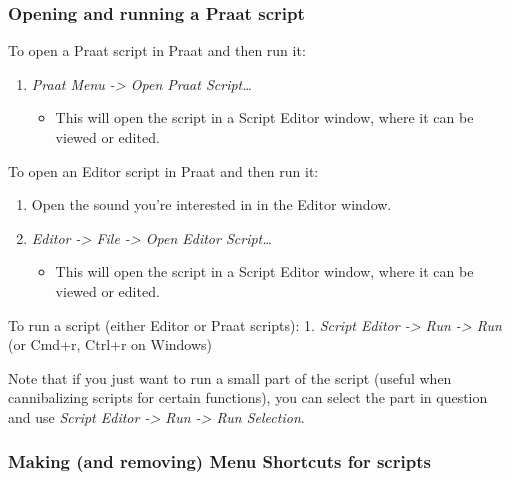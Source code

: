 \hypertarget{opening-and-running-a-praat-script}{%
\subsubsection{Opening and running a Praat
script}\label{opening-and-running-a-praat-script}}

To open a Praat script in Praat and then run it:

\begin{enumerate}
\def\labelenumi{\arabic{enumi}.}
\tightlist
\item
  \emph{Praat Menu -\textgreater{} Open Praat Script\ldots{}}

  \begin{itemize}
  \tightlist
  \item
    This will open the script in a Script Editor window, where it can be
    viewed or edited.
  \end{itemize}
\end{enumerate}

To open an Editor script in Praat and then run it:

\begin{enumerate}
\def\labelenumi{\arabic{enumi}.}
\tightlist
\item
  Open the sound you're interested in in the Editor window.
\item
  \emph{Editor -\textgreater{} File -\textgreater{} Open Editor
  Script\ldots{}}

  \begin{itemize}
  \tightlist
  \item
    This will open the script in a Script Editor window, where it can be
    viewed or edited.
  \end{itemize}
\end{enumerate}

To run a script (either Editor or Praat scripts): 1. \emph{Script Editor
-\textgreater{} Run -\textgreater{} Run} (or Cmd+r, Ctrl+r on Windows)

Note that if you just want to run a small part of the script (useful
when cannibalizing scripts for certain functions), you can select the
part in question and use \emph{Script Editor -\textgreater{} Run
-\textgreater{} Run Selection}.

\hypertarget{making-and-removing-menu-shortcuts-for-scripts}{%
\subsubsection{Making (and removing) Menu Shortcuts for
scripts}\label{making-and-removing-menu-shortcuts-for-scripts}}

